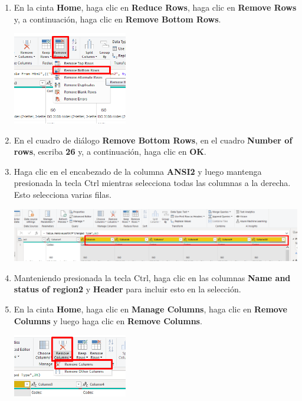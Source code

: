 \documentclass[12pt,letterpaper]{article}
\newcommand\tab[1][1cm]{\hspace*{#1}}
\begin{document}
\begin{enumerate}[\tab 1.]
        \item En la cinta \textbf{Home}, haga clic en \textbf{Reduce Rows}, haga clic en \textbf{Remove Rows} y, a continuación, haga clic en \textbf{Remove Bottom Rows}.
        \begin{center}
            \includegraphics[width=5cm]{./img/img59.png}
        \end{center}
        \item En el cuadro de diálogo \textbf{Remove Bottom Rows}, en el cuadro \textbf{Number of rows}, escriba \textbf{26} y, a continuación, haga clic en \textbf{OK}.
        \item Haga clic en el encabezado de la columna \textbf{ANSI2} y luego mantenga presionada la tecla Ctrl mientras selecciona todas las columnas a la derecha. Esto selecciona varias filas.
        \begin{center}
            \includegraphics[width=13cm]{./img/img61.png}
        \end{center}
        \item Manteniendo presionada la tecla Ctrl, haga clic en las columnas \textbf{Name and status of region2} y \textbf{Header} para incluir esto en la selección.
        \item En la cinta \textbf{Home}, haga clic en \textbf{Manage Columns}, haga clic en \textbf{Remove Columns} y luego haga clic en \textbf{Remove Columns}.
        \begin{center}
            \includegraphics[width=5cm]{./img/img63.png}
        \end{center}

\end{enumerate}
\end{document}
